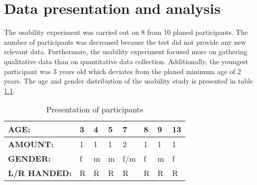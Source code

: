 \chapter{Data presentation and analysis}
\label{chap:dataanalysis}



The usability experiment was carried out on 8 from 10 planed participants. The number of participants was decreased because the test did not provide any new relevant data. Furthermore, the usability experiment focused more on gathering qualitative data than on quantitative data collection. Additionally, the youngest participant was 3 years old which deviates from the planed minimum age of 2 years. The age and gender distribution of the usability study is presented in table \ref{tab:participanttable}.



 \begin{table}[h]
     \centering
     \begin{tabular}{c|c|c|c|c|c|c|c}
     \hline
        \multicolumn{1}{|l|}{\textbf{AGE:}}  &
        \multicolumn{1}{l|}{3}  &     
        \multicolumn{1}{l|}{4}  & 
        \multicolumn{1}{l|}{5}  & 
        \multicolumn{1}{l|}{7}  & 
        \multicolumn{1}{l|}{8}  & 
        \multicolumn{1}{l|}{9}  & 
        \multicolumn{1}{l|}{13} \\ \hline
        \multicolumn{1}{|l|}{\textbf{AMOUNT:}} &
        \multicolumn{1}{l|}{1}  &
        \multicolumn{1}{l|}{1}  &
        \multicolumn{1}{l|}{1}  &
        \multicolumn{1}{l|}{2}  &
        \multicolumn{1}{l|}{1}  &
        \multicolumn{1}{l|}{1}  &
        \multicolumn{1}{l|}{1}  \\ \hline
        \multicolumn{1}{|l|}{\textbf{GENDER:}}  &
        \multicolumn{1}{|l|}{f} &
        \multicolumn{1}{l|}{m}  &
        \multicolumn{1}{l|}{m}  &
        \multicolumn{1}{l|}{f/m}&
        \multicolumn{1}{l|}{f}  &
        \multicolumn{1}{l|}{m}  &
        \multicolumn{1}{l|}{f}  \\ \hline
        \multicolumn{1}{|l|}{\textbf{L/R HANDED:}} &
        \multicolumn{1}{|l|}{R} &
        \multicolumn{1}{l|}{R}  &
        \multicolumn{1}{l|}{R}  &
        \multicolumn{1}{l|}{R}  &
        \multicolumn{1}{l|}{R}  &
        \multicolumn{1}{l|}{R}  &
        \multicolumn{1}{l|}{R}  \\ \hline
     \end{tabular}
     \caption{Presentation of participants}
     \label{tab:participanttable}
 \end{table}
 
